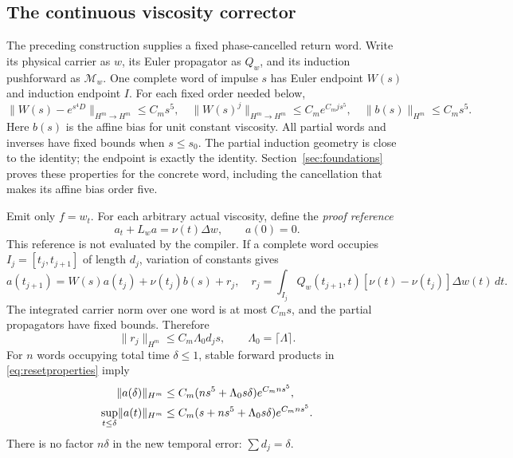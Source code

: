 \documentclass[11pt,a4paper]{amsart}
\theoremstyle{definition}
\theoremstyle{remark}
\numberwithin{equation}{section}
\newcommand{\Mcal}{\mathcal M}
\newcommand{\norm}[1]{\lVert #1\rVert}
\begin{document}
\subsection{The continuous viscosity corrector}
The preceding construction supplies a fixed phase-cancelled return word. Write its physical carrier as $w$, its Euler propagator as $Q_w$, and its induction pushforward as $\Mcal_w$. One complete word of impulse $s$ has Euler endpoint $W(s)$ and induction endpoint $I$. For each fixed order needed below,
\begin{equation}\label{eq:resetproperties}
 \norm{W(s)-e^{s^4D}}_{H^m\to H^m}\le C_ms^5,
 \quad \norm{W(s)^j}_{H^m\to H^m}\le C_me^{C_mjs^5},
 \quad \norm{b(s)}_{H^m}\le C_ms^5.
\end{equation}
Here $b(s)$ is the affine bias for unit constant viscosity. All partial words and inverses have fixed bounds when $s\le s_0$. The partial induction geometry is close to the identity; the endpoint is exactly the identity. Section~\ref{sec:foundations} proves these properties for the concrete word, including the cancellation that makes its affine bias order five.

Emit only $f=w_t$. For each arbitrary actual viscosity, define the \emph{proof reference}
\begin{equation}\label{eq:continuousa}
 a_t+L_wa=\nu(t)\Delta w,\qquad a(0)=0.
\end{equation}
This reference is not evaluated by the compiler. If a complete word occupies $I_j=[t_j,t_{j+1}]$ of length $d_j$, variation of constants gives
\[
 a(t_{j+1})=W(s)a(t_j)+\nu(t_j)b(s)+r_j,
 \quad
 r_j=\int_{I_j}Q_w(t_{j+1},t)[\nu(t)-\nu(t_j)]\Delta w(t)\,dt.
\]
The integrated carrier norm over one word is at most $C_ms$, and the partial propagators have fixed bounds. Therefore
\begin{equation}\label{eq:timeaffine}
 \norm{r_j}_{H^m}\le C_m\Lambda_0d_js,
 \qquad \Lambda_0=\lceil\Lambda\rceil.
\end{equation}
For $n$ words occupying total time $\delta\le1$, stable forward products in \eqref{eq:resetproperties} imply
\begin{align}\label{eq:affinecaps}
 \norm{a(\delta)}_{H^m}&\le C_m(ns^5+\Lambda_0s\delta)e^{C_mns^5},\notag\\
 \sup_{t\le\delta}\norm{a(t)}_{H^m}&\le C_m(s+ns^5+\Lambda_0s\delta)e^{C_mns^5}.
\end{align}
There is no factor $n\delta$ in the new temporal error: $\sum d_j=\delta$.
\end{document}
